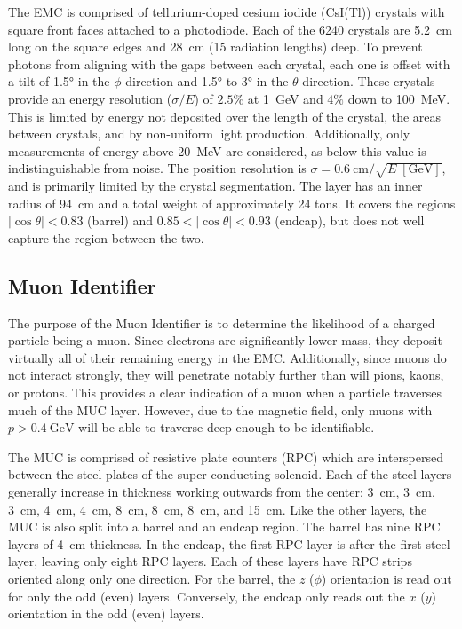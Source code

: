 The EMC is comprised of tellurium-doped cesium iodide (CsI(Tl)) crystals with square front faces attached to a photodiode.
Each of the 6240 crystals are \SI{5.2}{\cm} long on the square edges and \SI{28}{\cm} (15 radiation lengths) deep.
To prevent photons from aligning with the gaps between each crystal, each one is offset with a tilt of \ang{1.5} in the $\phi$-direction and \ang{1.5} to \ang{3} in the $\theta$-direction.
These crystals provide an energy resolution ($\sigma / E$) of $2.5\%$ at \SI{1}{\GeV} and $4\%$ down to \SI{100}{\MeV}.
This is limited by energy not deposited over the length of the crystal, the areas between crystals, and by non-uniform light production.
Additionally, only measurements of energy above \SI{20}{\MeV} are considered, as below this value is indistinguishable from noise.
The position resolution is $\sigma = \SI{0.6}{\cm} / \sqrt{E \; [\si{\GeV}]}$, and is primarily limited by the crystal segmentation.
The layer has an inner radius of \SI{94}{\cm} and a total weight of approximately 24 tons.
It covers the regions $|\cos\theta| < 0.83$ (barrel) and $0.85 < |\cos\theta| < 0.93$ (endcap), but does not well capture the region between the two.


\subsection{Muon Identifier}
\label{ssec:detector_mu}

The purpose of the Muon Identifier is to determine the likelihood of a charged particle being a muon.
Since electrons are significantly lower mass, they deposit virtually all of their remaining energy in the EMC.
Additionally, since muons do not interact strongly, they will penetrate notably further than will pions, kaons, or protons.
This provides a clear indication of a muon when a particle traverses much of the MUC layer.
However, due to the magnetic field, only muons with $p > \SI{0.4}{\GeV}$ will be able to traverse deep enough to be identifiable.


The MUC is comprised of resistive plate counters (RPC) which are interspersed between the steel plates of the super-conducting solenoid.
Each of the steel layers generally increase in thickness working outwards from the center: \SI{3}{\cm}, \SI{3}{\cm}, \SI{3}{\cm}, \SI{4}{\cm}, \SI{4}{\cm}, \SI{8}{\cm}, \SI{8}{\cm}, \SI{8}{\cm}, and \SI{15}{\cm}.
Like the other layers, the MUC is also split into a barrel and an endcap region.
The barrel has nine RPC layers of \SI{4}{\cm} thickness.
In the endcap, the first RPC layer is after the first steel layer, leaving only eight RPC layers.
Each of these layers have RPC strips oriented along only one direction.
For the barrel, the $z$ ($\phi$) orientation is read out for only the odd (even) layers.
Conversely, the endcap only reads out the $x$ ($y$) orientation in the odd (even) layers.


